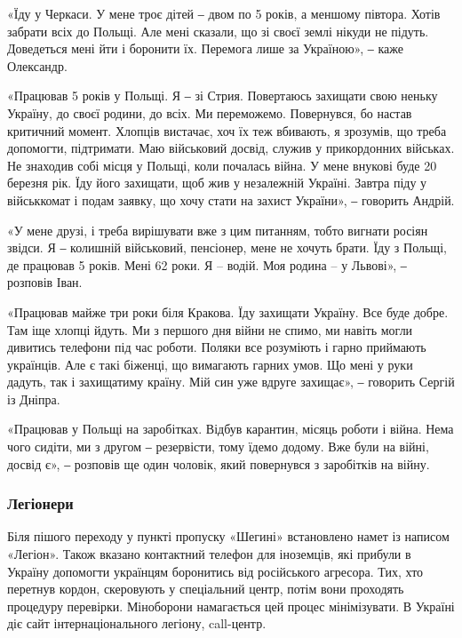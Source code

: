«Їду у Черкаси. У мене троє дітей ‒ двом по 5 років, а меншому півтора. Хотів
забрати всіх до Польщі. Але мені сказали, що зі своєї землі нікуди не підуть.
Доведеться мені йти і боронити їх. Перемога лише за Україною», ‒ каже
Олександр.

«Працював 5 років у Польщі. Я ‒ зі Стрия. Повертаюсь захищати свою неньку
Україну, до своєї родини, до всіх. Ми переможемо. Повернувся, бо настав
критичний момент. Хлопців вистачає, хоч їх теж вбивають, я зрозумів, що треба
допомогти, підтримати. Маю військовий досвід, служив у прикордонних військах.
Не знаходив собі місця у Польщі, коли почалась війна. У мене внукові буде 20
березня рік. Їду його захищати, щоб жив у незалежній Україні. Завтра піду у
військкомат і подам заявку, що хочу стати на захист України», ‒ говорить
Андрій.


«У мене друзі, і треба вирішувати вже з цим питанням, тобто вигнати росіян
звідси. Я ‒ колишній військовий, пенсіонер, мене не хочуть брати. Їду з Польщі,
де працював 5 років. Мені 62 роки. Я – водій. Моя родина – у Львові», ‒
розповів Іван.

«Працював майже три роки біля Кракова. Їду захищати Україну. Все буде добре.
Там іще хлопці йдуть. Ми з першого дня війни не спимо, ми навіть могли дивитись
телефони під час роботи. Поляки все розуміють і гарно приймають українців. Але
є такі біженці, що вимагають гарних умов. Що мені у руки дадуть, так і
захищатиму країну. Мій син уже вдруге захищає», ‒ говорить Сергій із Дніпра.

«Працював у Польщі на заробітках. Відбув карантин, місяць роботи і війна. Нема
чого сидіти, ми з другом ‒ резервісти, тому їдемо додому. Вже були на війні,
досвід є», ‒ розповів ще один чоловік, який повернувся з заробітків на війну.

\subsubsection{Легіонери}

Біля пішого переходу у пункті пропуску «Шегині» встановлено намет із написом
«Легіон». Також вказано контактний телефон для іноземців, які прибули в Україну
допомогти українцям боронитись від російського агресора. Тих, хто перетнув
кордон, скеровують у спеціальний центр, потім вони проходять процедуру
перевірки. Міноборони намагається цей процес мінімізувати. В Україні діє сайт
інтернаціонального легіону, call-центр.

